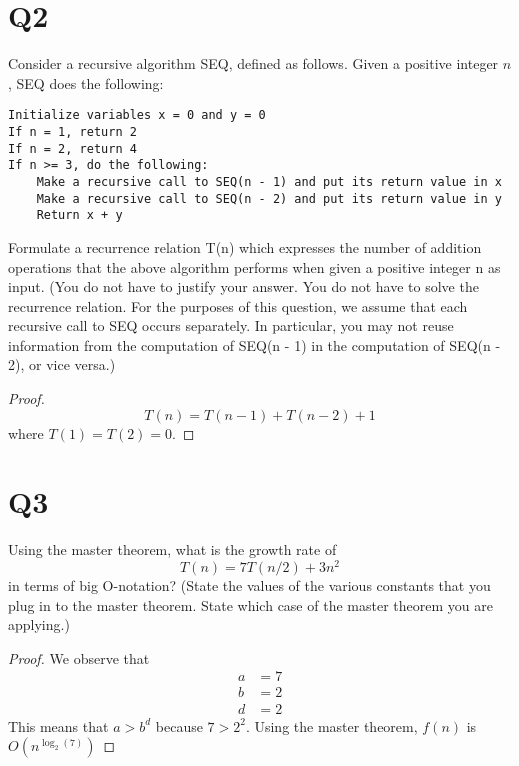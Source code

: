 \documentclass[11pt]{scrartcl}
\begin{document}
\section{Q2}
Consider a recursive algorithm SEQ, defined as follows. Given a
positive integer $n$, SEQ does the following:
\begin{verbatim}
Initialize variables x = 0 and y = 0
If n = 1, return 2
If n = 2, return 4
If n >= 3, do the following:
    Make a recursive call to SEQ(n - 1) and put its return value in x
    Make a recursive call to SEQ(n - 2) and put its return value in y
    Return x + y
\end{verbatim}
Formulate a recurrence relation T(n) which expresses the number of addition operations
that the above algorithm performs when given a positive integer n as input.
(You do not have to justify your answer. You do not have to solve the recurrence relation.
For the purposes of this question, we assume that each recursive call to SEQ occurs separately. 
In particular, you may not reuse information from the computation of SEQ(n - 1)
in the computation of SEQ(n - 2), or vice versa.)
\begin{proof}
	\[
		T(n) = T(n-1) + T(n-2) + 1
	\]
	where $T(1) = T(2) = 0$.
\end{proof}


\section{Q3}
Using the master theorem, what is the growth rate of
\[
	T(n) = 7T(n/2) + 3n^2	
\]
in terms of big O-notation? (State the values of the various constants that you plug in to
the master theorem. State which case of the master theorem you are applying.)
\begin{proof}
	We observe that 
	\begin{align*}
		a & = 7\\
		b & = 2\\
		d & = 2
	\end{align*}
	This means that $a > b^d$ because $7 > 2^2$. Using the master theorem, 
	$f(n)$ is $O(n^{\log_2(7)})$
\end{proof}
\end{document}
